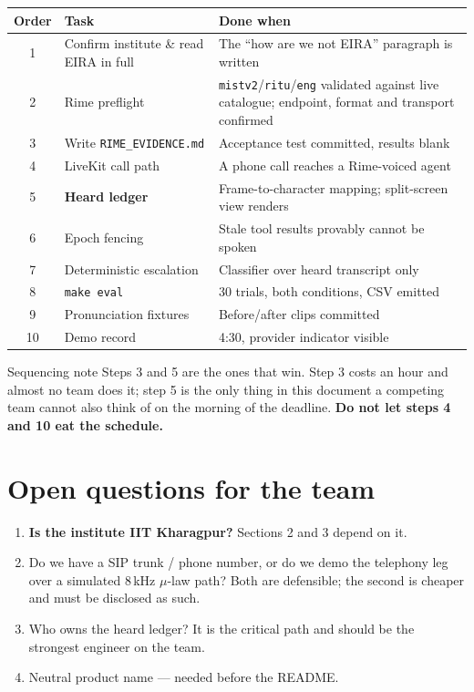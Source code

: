 \documentclass[11pt,a4paper]{article}
\newcommand{\code}[1]{\texttt{\small #1}}
\begin{document}
\begin{center}
\begin{tabular}{@{}clp{7.6cm}@{}}
\toprule
\textbf{Order} & \textbf{Task} & \textbf{Done when} \\
\midrule
1 & Confirm institute \& read EIRA in full & The ``how are we not EIRA'' paragraph is written \\
2 & Rime preflight & \code{mistv2}/\code{ritu}/\code{eng} validated against live catalogue; endpoint, format and transport confirmed \\
3 & Write \code{RIME\_EVIDENCE.md} & Acceptance test committed, results blank \\
4 & LiveKit call path & A phone call reaches a Rime-voiced agent \\
5 & \textbf{Heard ledger} & Frame-to-character mapping; split-screen view renders \\
6 & Epoch fencing & Stale tool results provably cannot be spoken \\
7 & Deterministic escalation & Classifier over heard transcript only \\
8 & \code{make eval} & 30 trials, both conditions, CSV emitted \\
9 & Pronunciation fixtures & Before/after clips committed \\
10 & Demo record & 4:30, provider indicator visible \\
\bottomrule
\end{tabular}
\end{center}

\begin{keybox}{Sequencing note}
Steps 3 and 5 are the ones that win. Step 3 costs an hour and almost no team does it;
step 5 is the only thing in this document a competing team cannot also think of on the
morning of the deadline. \textbf{Do not let steps 4 and 10 eat the schedule.}
\end{keybox}

\section{Open questions for the team}

\begin{enumerate}
\item \textbf{Is the institute IIT Kharagpur?} Sections 2 and 3 depend on it.
\item Do we have a SIP trunk / phone number, or do we demo the telephony leg over a
simulated 8\,kHz $\mu$-law path? Both are defensible; the second is cheaper and must be
disclosed as such.
\item Who owns the heard ledger? It is the critical path and should be the strongest
engineer on the team.
\item Neutral product name --- needed before the README.
\end{enumerate}
\end{document}
